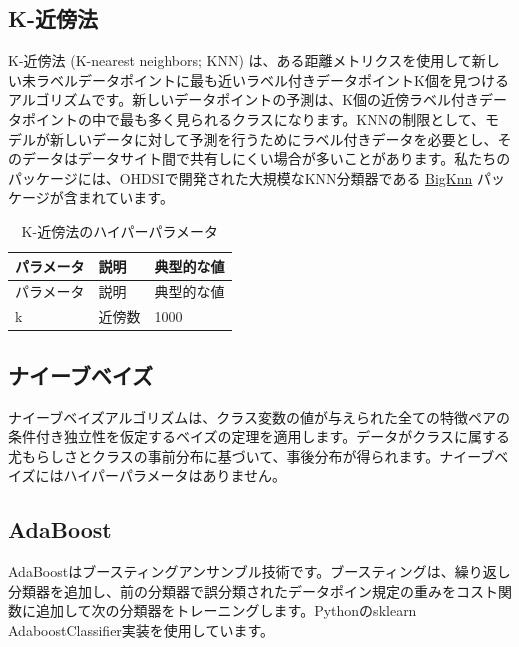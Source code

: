 \documentclass[
  11pt]{book}
\theoremstyle{definition}
\theoremstyle{definition}
\theoremstyle{definition}
\theoremstyle{definition}
\theoremstyle{remark}
\begin{document}
\subsection{K-近傍法}\label{k-ux8fd1ux508dux6cd5}

K-近傍法 (K-nearest neighbors; KNN) は、ある距離メトリクスを使用して新しい未ラベルデータポイントに最も近いラベル付きデータポイントK個を見つけるアルゴリズムです。新しいデータポイントの予測は、K個の近傍ラベル付きデータポイントの中で最も多く見られるクラスになります。KNNの制限として、モデルが新しいデータに対して予測を行うためにラベル付きデータを必要とし、そのデータはデータサイト間で共有しにくい場合が多いことがあります。私たちのパッケージには、OHDSIで開発された大規模なKNN分類器である \href{https://github.com/OHDSI/BigKnn}{BigKnn} パッケージが含まれています。  

\begin{longtable}[]{@{}lll@{}}
\caption{\label{tab:knnParameters} K-近傍法のハイパーパラメータ}\tabularnewline
\toprule\noalign{}
パラメータ & 説明 & 典型的な値 \\
\midrule\noalign{}
\endfirsthead
\toprule\noalign{}
パラメータ & 説明 & 典型的な値 \\
\midrule\noalign{}
\endhead
\bottomrule\noalign{}
\endlastfoot
k & 近傍数 & 1000 \\
\end{longtable}

\subsection{ナイーブベイズ}\label{ux30caux30a4ux30fcux30d6ux30d9ux30a4ux30ba}

ナイーブベイズアルゴリズムは、クラス変数の値が与えられた全ての特徴ペアの条件付き独立性を仮定するベイズの定理を適用します。データがクラスに属する尤もらしさとクラスの事前分布に基づいて、事後分布が得られます。ナイーブベイズにはハイパーパラメータはありません。 

\subsection{AdaBoost}\label{adaboost}

AdaBoostはブースティングアンサンブル技術です。ブースティングは、繰り返し分類器を追加し、前の分類器で誤分類されたデータポイン規定の重みをコスト関数に追加して次の分類器をトレーニングします。Pythonのsklearn AdaboostClassifier実装を使用しています。  
\end{document}

